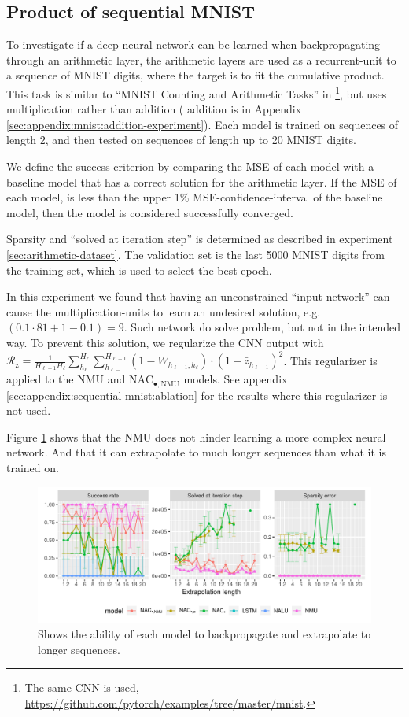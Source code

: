 \subsection{Product of sequential MNIST}
\label{section:results:cumprod_mnist}
To investigate if a deep neural network can be learned when backpropagating through an arithmetic layer, the arithmetic layers are used as a recurrent-unit to a sequence of MNIST digits, where the target is to fit the cumulative product. This task is similar to ``MNIST Counting and Arithmetic Tasks'' in \citet{trask-nalu}\footnote{The same CNN is used, \url{https://github.com/pytorch/examples/tree/master/mnist}.}, but uses multiplication rather than addition ( addition is in Appendix \ref{sec:appendix:mnist:addition-experiment}). Each model is trained on sequences of length 2, and then tested on sequences of length up to 20 MNIST digits.

We define the success-criterion by comparing the MSE of each model with a baseline model that has a correct solution for the arithmetic layer. If the MSE of each model, is less than the upper 1\% MSE-confidence-interval of the baseline model, then the model is considered successfully converged.

Sparsity and ``solved at iteration step'' is determined as described in experiment \ref{sec:arithmetic-dataset}. The validation set is the last 5000 MNIST digits from the training set, which is used to select the best epoch.

In this experiment we found that having an unconstrained ``input-network'' can cause the multiplication-units to learn an undesired solution, e.g. $(0.1 \cdot 81 + 1 - 0.1) = 9$. Such network do solve problem, but not in the intended way. To prevent this solution, we regularize the CNN output with $\mathcal{R}_{\mathrm{z}} = \frac{1}{H_{\ell-1} H_\ell} \sum_{h_\ell}^{H_\ell} \sum_{h_{\ell-1}}^{H_{\ell-1}} (1 - W_{h_{\ell-1},h_\ell}) \cdot (1 - \bar{z}_{h_{\ell-1}})^2$. This regularizer is applied to the NMU and $\mathrm{NAC}_{\bullet,\mathrm{NMU}}$ models. See appendix \ref{sec:appendix:sequential-mnist:ablation} for the results where this regularizer is not used.

Figure \ref{fig:sequential-mnist-prod-results} shows that the NMU does not hinder learning a more complex neural network. And that it can extrapolate to much longer sequences than what it is trained on.

\begin{figure}[h]
\centering
\includegraphics[width=\linewidth,trim={0 0.5cm 0 0},clip]{results/sequential_mnist_prod_long.pdf}
\caption{Shows the ability of each model to backpropagate and extrapolate to longer sequences.} 
\label{fig:sequential-mnist-prod-results}
\end{figure}
